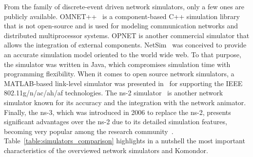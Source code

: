 \documentclass{article}
\begin{document}
	From the family of discrete-event driven network simulators, only a few ones are publicly available. OMNET++~\cite{varga2008overview} is a component-based C++ simulation library that is not open-source and is used for modeling communication networks and distributed multiprocessor systems. OPNET is another commercial simulator that allows the integration of external components. NetSim~\cite{rathi1990new} was conceived to provide an accurate simulation model oriented to the world wide web. To that purpose, the simulator was written in Java, which compromises simulation time with programming flexibility. When it comes to open source network simulators, a MATLAB-based link-level simulator was presented in~\cite{milos2016link} for supporting the IEEE 802.11g/n/ac/ah/af technologies. The ns-2 simulator~\cite{issariyakul2012introduction} is another network simulator known for its accuracy and the integration with the network animator. Finally, the ns-3, which was introduced in 2006 to replace the ns-2, presents significant advantages over the ns-2 due to its detailed simulation features, becoming very popular among the research community~\cite{riley2010ns}. Table~\ref{table:simulators_comparison} highlights in a nutshell the most important characteristics of the overviewed network simulators and Komondor.
	
\end{document}
